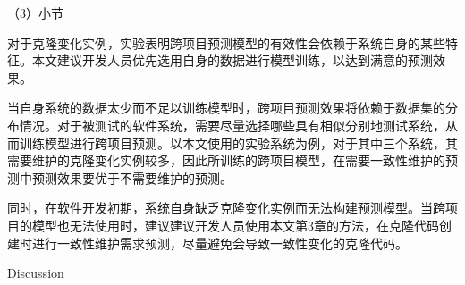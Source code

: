 
（3）小节

对于克隆变化实例，实验表明跨项目预测模型的有效性会依赖于系统自身的某些特征。本文建议开发人员优先选用自身的数据进行模型训练，以达到满意的预测效果。

当自身系统的数据太少而不足以训练模型时，跨项目预测效果将依赖于数据集的分布情况。对于被测试的软件系统，需要尽量选择哪些具有相似分别地测试系统，从而训练模型进行跨项目预测。以本文使用的实验系统为例，对于其中三个系统，其需要维护的克隆变化实例较多，因此所训练的跨项目模型，在需要一致性维护的预测中预测效果要优于不需要维护的预测。

同时，在软件开发初期，系统自身缺乏克隆变化实例而无法构建预测模型。当跨项目的模型也无法使用时，建议建议开发人员使用本文第3章的方法，在克隆代码创建时进行一致性维护需求预测，尽量避免会导致一致性变化的克隆代码。

{Discussion}

